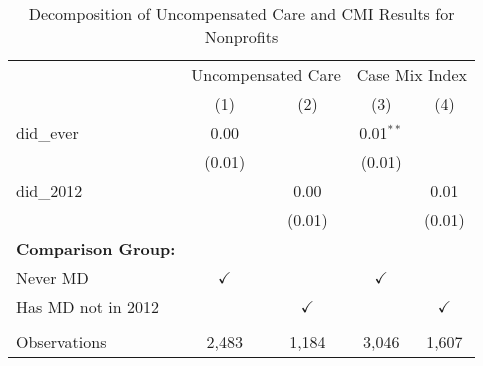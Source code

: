 \begin{table}[htbp]
   \caption{\label{tab:MD_noMD_uncompCMI_decomp_fullsample} Decomposition of Uncompensated Care and CMI Results for Nonprofits}
   \bigskip
   \centering
   \begin{tabular}{lcccc}
      \toprule
       & \multicolumn{2}{c}{Uncompensated Care} & \multicolumn{2}{c}{Case Mix Index}\\
                                  & (1)           & (2)           & (3)           & (4)\\  
      \midrule 
      did\_ever                   & 0.00          &               & 0.01$^{**}$   &   \\   
                                  & (0.01)        &               & (0.01)        &   \\   
      did\_2012                   &               & 0.00          &               & 0.01\\   
                                  &               & (0.01)        &               & (0.01)\\   
      \textbf{Comparison Group:}  &               &               &               & \\  
      Never MD                    & $\checkmark$  &               & $\checkmark$  &  \\  
      Has MD not in 2012          &               & $\checkmark$  &               & $\checkmark$\\   
       \\
      Observations                & 2,483         & 1,184         & 3,046         & 1,607\\  
      \bottomrule
   \end{tabular}
\end{table}
